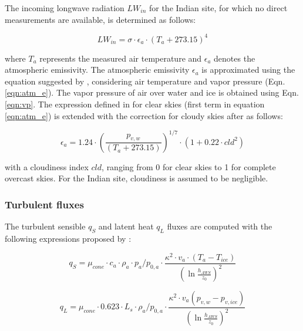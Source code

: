 The incoming longwave radiation $LW_{in}$ for the Indian site, for which no direct measurements are available, is
determined as follows:

\begin{equation}
	LW_{in}=\sigma \cdot \epsilon_a \cdot {(T_a+ 273.15)}^4
	\label{eqn:LWin}
\end{equation}

where $T_a$ represents the measured air temperature and $\epsilon_a$ denotes the atmospheric emissivity. The atmospheric emissivity $\epsilon_a$ is approximated using the equation suggested by \cite{brutsaertEvaporationAtmosphereTheory1982},
considering air temperature and vapor pressure (Eqn.  \ref{eqn:atm_e}). The vapor pressure of air over water and
ice is obtained using Eqn. \ref{eqn:vp}. The expression defined in \cite{brutsaertDerivableFormulaLongwave1975} for clear skies
(first term in equation \ref{eqn:atm_e}) is extended with the correction for cloudy skies after
\cite{brutsaertEvaporationAtmosphereTheory1982} as follows:

\begin{equation}
	\epsilon_a=1.24 \cdot (\frac{p_{v,w}}{(T_a+273.15)})^{1/7}\cdot(1+0.22\cdot{cld}^2) \label{eqn:atm_e}
\end{equation}

with a cloudiness index $cld$, ranging from 0 for clear skies to 1 for complete overcast skies. For the Indian
site, cloudiness is assumed to be negligible.

\subsubsection{Turbulent fluxes} \label{sec:Qs}

The turbulent sensible $q_{S}$ and latent heat $q_{L}$ fluxes are computed with the following expressions
proposed by \cite{garrattAtmosphericBoundaryLayer1992}:

\begin{equation}
	q_{S}=\mu_{cone}\cdot c_{a} \cdot \rho_{a} \cdot p_{a}/p_{0,a} \cdot \frac{\kappa^2 \cdot v_a \cdot
		(T_a-T_{ice})}{{(\ln{\frac{h_{AWS}}{z_{0}}})}^2}
	\label{eqn:qs}
\end{equation}

\begin{equation}
	q_{L}=\mu_{cone}\cdot 0.623 \cdot L_s \cdot \rho_{a}/p_{0,a} \cdot \frac{\kappa^2 \cdot
	v_a(p_{v,w}-p_{v,ice})}{{(\ln{\frac{h_{AWS}}{z_{0}}})}^2}
\end{equation}


